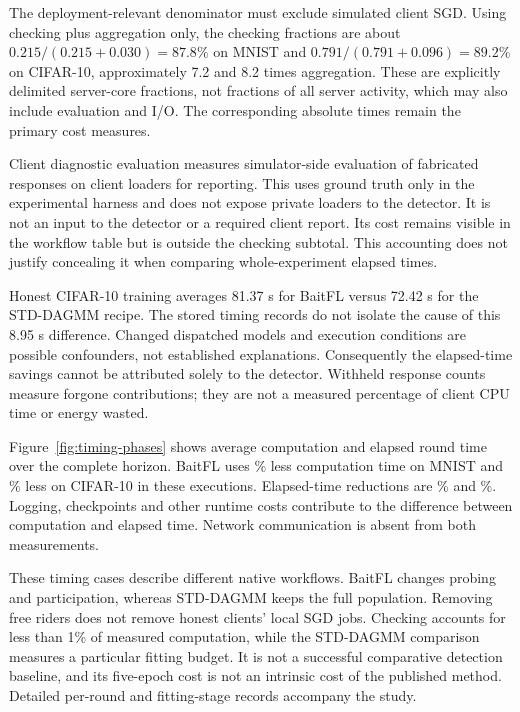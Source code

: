 \documentclass[journal]{IEEEtran}
\begin{document}
The deployment-relevant denominator must exclude simulated client SGD.
Using checking plus aggregation only, the checking fractions are about
$0.215/(0.215+0.030)=87.8\%$ on MNIST and
$0.791/(0.791+0.096)=89.2\%$ on CIFAR-10, approximately 7.2 and 8.2 times
aggregation. These are explicitly delimited server-core fractions, not
fractions of all server activity, which may also include evaluation and
I/O. The corresponding absolute times remain the primary cost measures.

Client diagnostic evaluation measures simulator-side evaluation of fabricated
responses on client loaders for reporting. This uses ground truth only in the
experimental harness and does not expose private loaders to the detector.
It is not an input to the detector or a required
client report. Its cost remains visible in the workflow table but is
outside the checking subtotal. This accounting does not justify concealing
it when comparing whole-experiment elapsed times.

Honest CIFAR-10 training averages 81.37 s for BaitFL versus 72.42 s for
the STD-DAGMM recipe. The stored timing records do not isolate the cause
of this 8.95 s difference. Changed dispatched models and execution
conditions are possible confounders, not established explanations.
Consequently the elapsed-time savings cannot be attributed solely to the
detector. Withheld response counts measure forgone contributions; they
are not a measured percentage of client CPU time or energy wasted.

Figure~\ref{fig:timing-phases} shows average
computation and elapsed round time over the complete horizon. BaitFL uses
\TimingMnistReduction\% less computation time on MNIST and
\TimingCifarReduction\% less on CIFAR-10 in these executions. Elapsed-time
reductions are \TimingMnistWallReduction\% and
\TimingCifarWallReduction\%. Logging, checkpoints and other runtime costs
contribute to the difference between computation and elapsed time. Network
communication is absent from both measurements.



These timing cases describe different native workflows. BaitFL changes
probing and participation, whereas STD-DAGMM keeps the full population.
Removing free riders does not remove honest clients' local SGD jobs.
Checking accounts for less than 1\% of measured computation,
while the STD-DAGMM comparison measures a particular fitting budget.
It is not a successful comparative detection baseline, and its five-epoch
cost is not an intrinsic cost of the published method.
Detailed per-round and fitting-stage records accompany the study.
\end{document}
